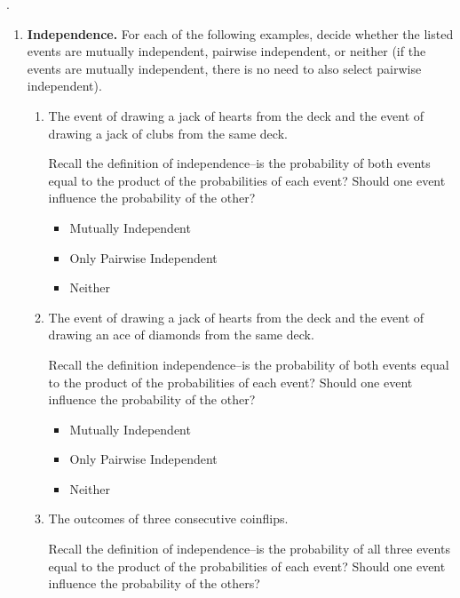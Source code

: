 \documentclass[11pt, preview]{standalone} %
\date{} %
\begin{document}
.

\begin{enumerate}
\item {\bf Independence.} For each of the following examples, decide whether the listed events are mutually independent, pairwise independent, or neither (if the events are mutually independent, there is no need to also select pairwise independent).
\begin{enumerate}
\item The event of drawing a jack of hearts from the deck and the event of drawing a jack of clubs from the same deck. 
\begin{Multi}
Recall the definition of independence--is the probability of both events equal to the product of the probabilities of each event? Should one event influence the probability of the other?
\begin{itemize}
\FalseChoice\item Mutually Independent
\FalseChoice\item Only Pairwise Independent
\TrueChoice\item Neither
\end{itemize}
\end{Multi}
\item The event of drawing a jack of hearts from the deck and the event of drawing an ace of diamonds from the same deck. 
\begin{Multi}
Recall the definition independence--is the probability of both events equal to the product of the probabilities of each event? Should one event influence the probability of the other?
\begin{itemize}
\FalseChoice\item Mutually Independent
\FalseChoice\item Only Pairwise Independent
\TrueChoice\item Neither
\end{itemize}
\end{Multi}
\item The outcomes of three consecutive coinflips.
\begin{Multi}
Recall the definition of independence--is the probability of all three events equal to the product of the probabilities of each event? Should one event influence the probability of the others?
\begin{itemize}

\end{itemize}
\end{Multi}
\end{enumerate}
\end{enumerate}
\end{document}
